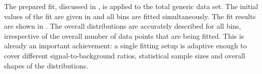 The prepared fit, discussed in , is applied to the total generic \MC data set.
The initial values of the fit are given in  and all bins are fitted simultaneously.
The fit results are shown in .
The overall \Mbc distributions are accurately described for all \EB bins, irrespective of the overall number of data points that are being fitted.
This is already an important achievement: a single fitting setup is adaptive enough to cover different signal-to-background ratios, statistical sample sizes and overall shapes of the distributions.
\begin{figure}[hbtp!]
    \centering
\end{figure}
